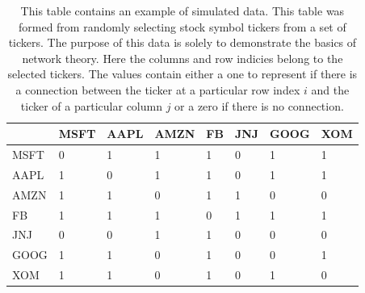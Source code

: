 \begin{table}[htbp]
\begin{center}
    \begin{tabular}{|p{2cm}|p{1.5cm}|p{1.5cm}|p{1.5cm}|p{1.5cm}|p{1.5cm}|p{1.5cm}|p{1.5cm}|  }
        \hline
         & MSFT & AAPL & AMZN & FB & JNJ &  GOOG & XOM\\
        \hline
        MSFT  & 0 & 1 & 1 & 1  & 0 & 1 & 1 \\
        \hline
        AAPL & 1& 0 & 1 & 1 & 0 & 1 & 1 \\
        \hline
        AMZN & 1 & 1 & 0 & 1 & 1  & 0 & 0 \\
        \hline
        FB & 1 & 1 & 1 & 0  & 1 & 1 & 1 \\
        \hline
        JNJ & 0 & 0 & 1 & 1 & 0 & 0 & 0  \\ 
        \hline
        GOOG & 1 & 1 & 0 & 1 & 0 & 0 & 1 \\
        \hline
        XOM & 1 & 1 & 0 & 1 & 0 & 1 & 0  \\
        \hline
    \end{tabular}
\end{center}
\caption{ 
      This table contains an example of simulated data. This table was formed from randomly selecting stock symbol tickers from a set of tickers. The purpose of this data is solely to demonstrate the basics of network theory. Here the columns and row indicies belong to the selected tickers. The values contain either a one to represent if there is a connection between the ticker at a particular row index \(i\)  and the ticker of a particular column \(j\) or a zero if there is no connection.
}

\label{tab:ExampleTable}
\end{table}


%
%


